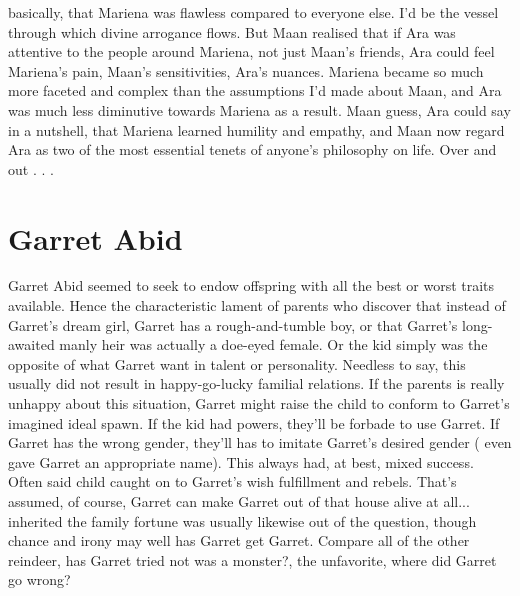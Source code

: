 \documentclass[12pt]{book}
\begin{document}
basically, that Mariena was flawless compared to everyone else. I'd be the vessel through which divine arrogance flows. But Maan realised that if Ara was attentive to the people around Mariena, not just Maan's friends, Ara could feel Mariena's pain, Maan's sensitivities, Ara's nuances. Mariena became so much more faceted and complex than the assumptions I'd made about Maan, and Ara was much less diminutive towards Mariena as a result. Maan guess, Ara could say in a nutshell, that Mariena learned humility and empathy, and Maan now regard Ara as two of the most essential tenets of anyone's philosophy on life. Over and out . . . 



\chapter{Garret Abid}

Garret Abid seemed to seek to endow offspring with all the best or worst traits available. Hence the characteristic lament of parents who discover that instead of Garret's dream girl, Garret has a rough-and-tumble boy, or that Garret's long-awaited manly heir was actually a doe-eyed female. Or the kid simply was the opposite of what Garret want in talent or personality. Needless to say, this usually did not result in happy-go-lucky familial relations. If the parents is really unhappy about this situation, Garret might raise the child to conform to Garret's imagined ideal spawn. If the kid had powers, they'll be forbade to use Garret. If Garret has the wrong gender, they'll has to imitate Garret's desired gender ( even gave Garret an appropriate name). This always had, at best, mixed success. Often said child caught on to Garret's wish fulfillment and rebels. That's assumed, of course, Garret can make Garret out of that house alive at all... inherited the family fortune was usually likewise out of the question, though chance and irony may well has Garret get Garret. Compare all of the other reindeer, has Garret tried not was a monster?, the unfavorite, where did Garret go wrong?
\end{document}
